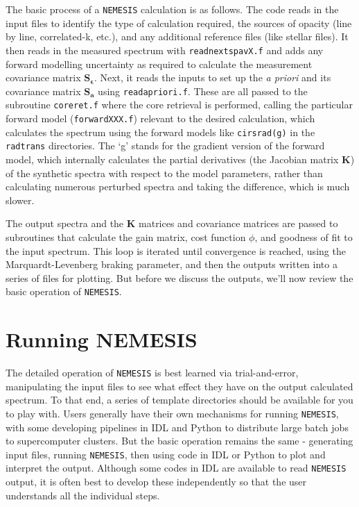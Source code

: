 \documentclass[final,5p,times,twocolumn,authoryear]{elsarticle}
\begin{document}
The basic process of a \verb#NEMESIS# calculation is as follows.  The code reads in the input files to identify the type of calculation required, the sources of opacity (line by line, correlated-k, etc.), and any additional reference files (like stellar files).   It then reads in the measured spectrum with \verb#readnextspavX.f# and adds any forward modelling uncertainty as required to calculate the measurement covariance matrix $\mathbf{S_{\epsilon }}$.  Next, it reads the inputs to set up the \textit{a priori} and its covariance matrix $\mathbf{S_{a}}$ using \verb#readapriori.f#.  These are all passed to the subroutine \verb#coreret.f# where the core retrieval is performed, calling the particular forward model (\verb#forwardXXX.f#) relevant to the desired calculation, which calculates the spectrum using the forward models like \verb#cirsrad(g)# in the \verb#radtrans# directories.  The `g' stands for the gradient version of the forward model, which internally calculates the partial derivatives (the Jacobian matrix $\mathbf{K}$) of the synthetic spectra with respect to the model parameters, rather than calculating numerous perturbed spectra and taking the difference, which is much slower.

The output spectra and the $\mathbf{K}$ matrices and covariance matrices are passed to subroutines that calculate the gain matrix, cost function $\phi$, and goodness of fit to the input spectrum. This loop is iterated until convergence is reached, using the Marquardt-Levenberg braking parameter, and then the outputs written into a series of files for plotting.  But before we discuss the outputs, we'll now review the basic operation of \verb#NEMESIS#.




\section{Running NEMESIS}

The detailed operation of \verb#NEMESIS# is best learned via trial-and-error, manipulating the input files to see what effect they have on the output calculated spectrum.  To that end, a series of template directories should be available for you to play with.  Users generally have their own mechanisms for running \verb#NEMESIS#, with some developing pipelines in IDL and Python to distribute large batch jobs to supercomputer clusters.  But the basic operation remains the same - generating input files, running \verb#NEMESIS#, then using code in IDL or Python to plot and interpret the output.  Although some codes in IDL are available to read \verb#NEMESIS# output, it is often best to develop these independently so that the user understands all the individual steps.  
\end{document}
